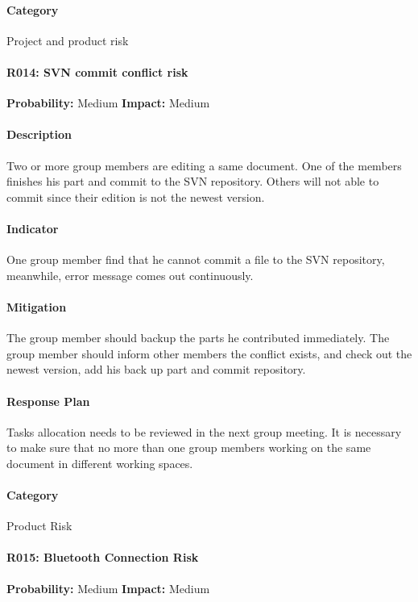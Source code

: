 \documentclass[11pt, a4paper]{report}
\begin{document}
	\paragraph{Category}Project and product risk

	\paragraph{R014: SVN commit conflict risk} \hspace{1cm} \textbf{Probability: }Medium\hspace{1cm}   \textbf{Impact: }Medium
	\paragraph{Description}Two or more group members are editing a same document. One of the members finishes his part and commit to the SVN repository. Others will not able to commit since their edition is not the newest version.
	\paragraph{Indicator}One group member find that he cannot commit a file to the SVN repository, meanwhile, error message comes out continuously.
	\paragraph{Mitigation}The group member should backup the parts he contributed immediately. The group member should inform other members the conflict exists, and check out the newest version, add his back up part and commit repository.
	\paragraph{Response Plan}Tasks allocation needs to be reviewed in the next group meeting. It is necessary to make sure that no more than one group members working on the same document in different working spaces. \\
	\paragraph{Category}Product Risk
	
	\paragraph{R015: Bluetooth Connection Risk} \hspace{1cm} \textbf{Probability: }Medium\hspace{1cm}   \textbf{Impact: }Medium
\end{document}
